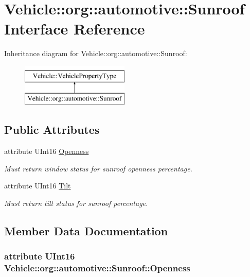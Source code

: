 \hypertarget{interfaceVehicle_1_1org_1_1automotive_1_1Sunroof}{\section{Vehicle\-:\-:org\-:\-:automotive\-:\-:Sunroof Interface Reference}
\label{interfaceVehicle_1_1org_1_1automotive_1_1Sunroof}
}
Inheritance diagram for Vehicle\-:\-:org\-:\-:automotive\-:\-:Sunroof\-:\begin{figure}[H]
\begin{center}
\leavevmode
\includegraphics[height=2.000000cm]{interfaceVehicle_1_1org_1_1automotive_1_1Sunroof}
\end{center}
\end{figure}
\subsection*{Public Attributes}
\begin{DoxyCompactItemize}
\item 
attribute U\-Int16 \hyperlink{interfaceVehicle_1_1org_1_1automotive_1_1Sunroof_aba757434eddf2895c71a7c4d81f73122}{Openness}
\begin{DoxyCompactList}\small\item\em Must return window status for sunroof openness percentage. \end{DoxyCompactList}\item 
attribute U\-Int16 \hyperlink{interfaceVehicle_1_1org_1_1automotive_1_1Sunroof_a4113c6fe43ac0f34192346c515e0af75}{Tilt}
\begin{DoxyCompactList}\small\item\em Must return tilt status for sunroof percentage. \end{DoxyCompactList}\end{DoxyCompactItemize}


\subsection{Member Data Documentation}
\hypertarget{interfaceVehicle_1_1org_1_1automotive_1_1Sunroof_aba757434eddf2895c71a7c4d81f73122}{
\subsubsection[{Openness}]{\setlength{\rightskip}{0pt plus 5cm}attribute U\-Int16 Vehicle\-::org\-::automotive\-::\-Sunroof\-::\-Openness}}\label{interfaceVehicle_1_1org_1_1automotive_1_1Sunroof_aba757434eddf2895c71a7c4d81f73122}


